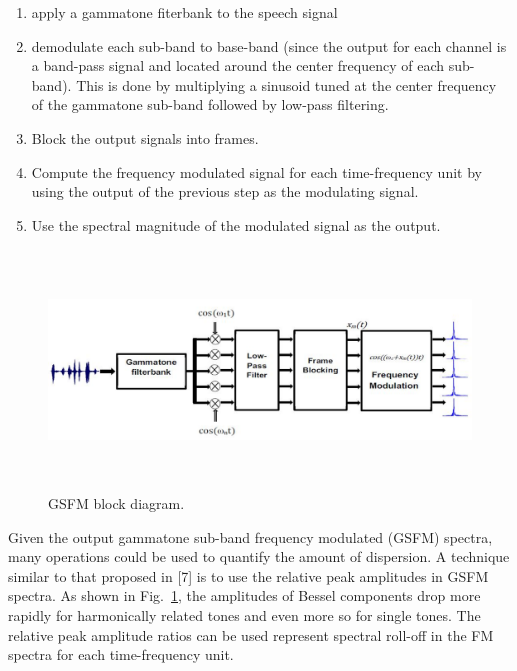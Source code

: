 {\begin{enumerate}
	\item apply a gammatone fiterbank to the speech signal
	\item demodulate each sub-band to base-band (since the output for each channel is a band-pass signal and located around the center frequency of each sub-band). 
	This is done by	multiplying a sinusoid tuned at the center frequency of	the gammatone sub-band followed by low-pass filtering.
	\item Block the output signals into frames. 
	\item Compute the frequency modulated signal for each time-frequency unit by using the output of the previous step as the modulating signal. 
	\item Use the spectral magnitude of the modulated signal as the output.
\end{enumerate}

\begin{figure}[h!]
	\centering
	\hspace{-1mm}
	\includegraphics[height = 2.5in, width=1\textwidth]{figures/gsfm_block_diagram}
	\vspace{-1mm}
	\caption{GSFM block diagram.}
	\vspace{0mm}
	\label{fig:tone_fm_spectra}
\end{figure}

Given the output gammatone sub-band frequency modulated (GSFM) spectra, many operations could be used to quantify the amount of dispersion. 
A technique similar to that proposed in [7] is to use the relative peak amplitudes in GSFM spectra. 
As shown in Fig.~\ref{fig:tone_fm_spectra}, the amplitudes of Bessel components drop
more rapidly for harmonically related tones and even more so for single tones. 
The relative peak amplitude ratios can be used represent spectral roll-off in the FM spectra for each time-frequency unit. 

}
